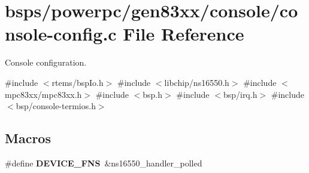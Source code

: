 \hypertarget{powerpc_2gen83xx_2console_2console-config_8c}{}\section{bsps/powerpc/gen83xx/console/console-\/config.c File Reference}
\label{powerpc_2gen83xx_2console_2console-config_8c}


Console configuration.  


{\ttfamily \#include $<$rtems/bsp\+Io.\+h$>$}\newline
{\ttfamily \#include $<$libchip/ns16550.\+h$>$}\newline
{\ttfamily \#include $<$mpc83xx/mpc83xx.\+h$>$}\newline
{\ttfamily \#include $<$bsp.\+h$>$}\newline
{\ttfamily \#include $<$bsp/irq.\+h$>$}\newline
{\ttfamily \#include $<$bsp/console-\/termios.\+h$>$}\newline
\subsection*{Macros}
\begin{DoxyCompactItemize}
\item 
\mbox{\label{powerpc_2gen83xx_2console_2console-config_8c_aa1e88fec2a0add03b025c33d9c965738}} 
\#define {\bfseries D\+E\+V\+I\+C\+E\+\_\+\+F\+NS}~\&ns16550\+\_\+handler\+\_\+polled
\end{DoxyCompactItemize}
